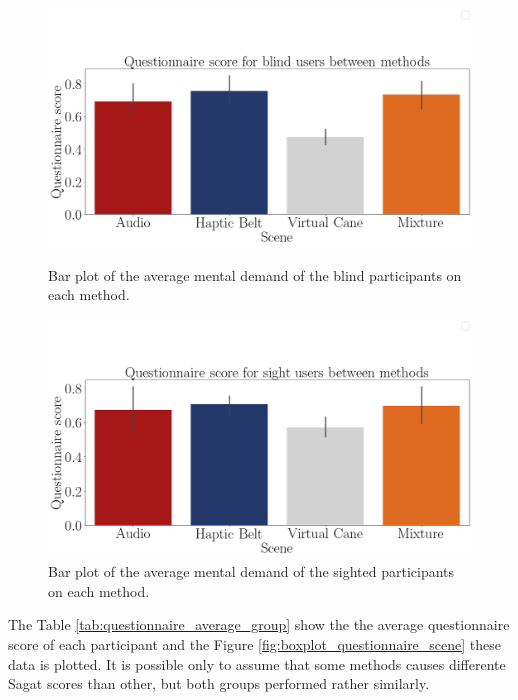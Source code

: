\begin{figure}[!htb]
    \centering
    \begin{minipage}{\textwidth}
        \centering
        \includegraphics[width = 0.8\linewidth]{Resultados/Questionario/Figuras/png/barplot_questionnaire_scene_blind.png}
        \caption{Bar plot of the average mental demand of the blind participants on each method.}
        \label{fig:barplot_questionnaire_scene_blind}
    \end{minipage}
    \begin{minipage}{\textwidth}
        \centering
        \includegraphics[width = 0.8\linewidth]{Resultados/Questionario/Figuras/png/barplot_questionnaire_scene_sight.png}
        \caption{Bar plot of the average mental demand of the sighted participants on each method.}
        \label{fig:barplot_questionnaire_scene_sight}
    \end{minipage}
\end{figure}

The Table \ref{tab:questionnaire_average_group} show the the average questionnaire score of each participant and the Figure \ref{fig:boxplot_questionnaire_scene} these data is plotted. It is possible only to assume that some methods causes differente Sagat scores than other, but both groups performed rather similarly.

